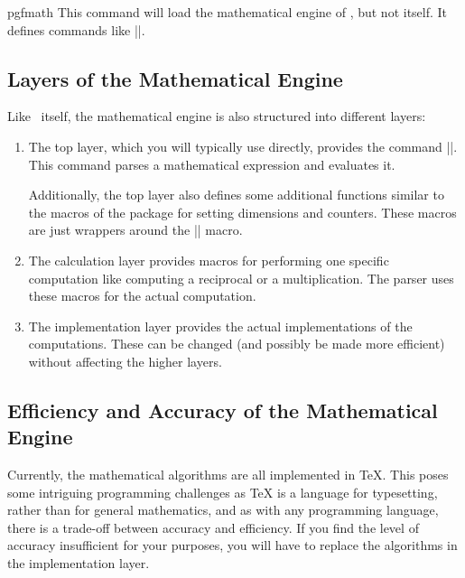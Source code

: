 \begin{package}{pgfmath}
    This command will load the mathematical engine of \pgfname, but not
    \pgfname{} itself. It defines commands like |\pgfmathparse|.
\end{package}


\subsection{Layers of the Mathematical Engine}

Like \pgfname\ itself, the mathematical engine is also structured into
different layers:
%
\begin{enumerate}
    \item The top layer, which you will typically use directly, provides the
        command |\pgfmathparse|. This command parses a mathematical expression
        and evaluates it.

        Additionally, the top layer also defines some additional functions
        similar to the macros of the \calcname{} package for setting dimensions
        and counters. These macros are just wrappers around the |\pgfmathparse|
        macro.

    \item The calculation layer provides macros for performing one specific
        computation like computing a reciprocal or a multiplication. The parser
        uses these macros for the actual computation.
    \item The implementation layer provides the actual implementations of the
        computations. These can be changed (and possibly be made more
        efficient) without affecting the higher layers.
\end{enumerate}


\subsection{Efficiency and Accuracy of the Mathematical Engine}

Currently, the mathematical algorithms are all implemented in \TeX. This poses
some intriguing programming challenges as \TeX{} is a language for typesetting,
rather than for general mathematics, and as with any programming language,
there is a trade-off between accuracy and efficiency. If you find the level of
accuracy insufficient for your purposes, you will have to replace the
algorithms in the implementation layer.

